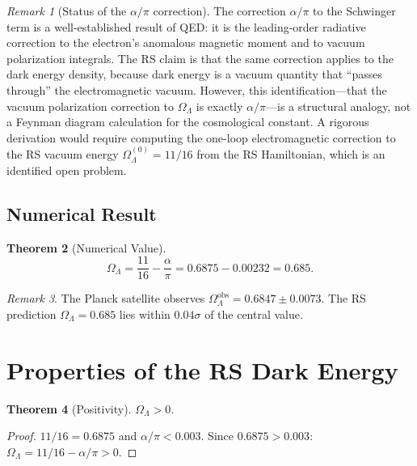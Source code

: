 \documentclass[12pt,a4paper]{article}
\newtheorem{theorem}{Theorem}[section]
\theoremstyle{definition}
\theoremstyle{remark}
\newtheorem{remark}[theorem]{Remark}
\begin{document}
\begin{remark}[Status of the $\alpha/\pi$ correction]
\label{rem:alpha-pi}
The correction $\alpha/\pi$ to the Schwinger term is a well-established
result of QED: it is the leading-order radiative correction to the
electron's anomalous magnetic moment and to vacuum polarization
integrals.  The RS claim is that the same correction applies to the
dark energy density, because dark energy is a vacuum quantity that
``passes through'' the electromagnetic vacuum.  However, this
identification---that the vacuum polarization correction to $\Omega_\Lambda$
is exactly $\alpha/\pi$---is a structural analogy, not a Feynman diagram
calculation for the cosmological constant.  A rigorous derivation
would require computing the one-loop electromagnetic correction to
the RS vacuum energy $\Omega_\Lambda^{(0)} = 11/16$ from the RS
Hamiltonian, which is an identified open problem.
\end{remark}

\subsection{Numerical Result}

\begin{theorem}[Numerical Value]
\label{thm:numerical}
\begin{equation}
  \boxed{\Omega_\Lambda = \frac{11}{16} - \frac{\alpha}{\pi}
  = 0.6875 - 0.00232 = 0.685.}
\end{equation}
\end{theorem}

\begin{remark}
The Planck satellite observes
$\Omega_\Lambda^{\mathrm{obs}} = 0.6847 \pm 0.0073$.  The RS
prediction $\Omega_\Lambda = 0.685$ lies within $0.04\sigma$ of the
central value.
\end{remark}

\section{Properties of the RS Dark Energy}
\label{sec:properties}

\begin{theorem}[Positivity]
$\Omega_\Lambda > 0$.
\end{theorem}

\begin{proof}
$11/16 = 0.6875$ and $\alpha/\pi < 0.003$.  Since $0.6875 > 0.003$:
$\Omega_\Lambda = 11/16 - \alpha/\pi > 0$.
\end{proof}
\end{document}
